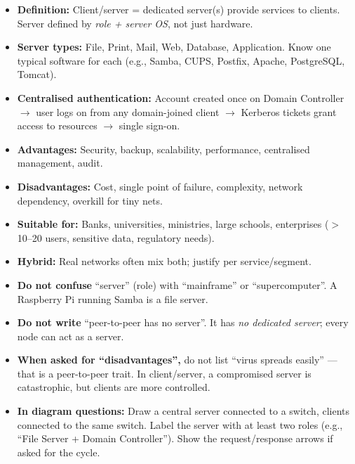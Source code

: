 \documentclass[11pt]{article}
\newcounter{popsec}
\newcounter{popsub}
\newcommand{\courssub}[1]{%
  \stepcounter{popsub}%
  \par\vspace{9pt}\noindent{\popxbold\fontsize{11.5}{13}\selectfont\color{popink}{\color{poporange}\thepopsec.\thepopsub}\hspace{6pt}#1}\par\nopagebreak\vspace{4pt}
}
\begin{document}
\courssub{Summary and Examination Focus}

\begin{aretenir}
\begin{itemize}
\item \textbf{Definition:} Client/server = dedicated server(s) provide services to clients. Server defined by \emph{role + server OS}, not just hardware.
\item \textbf{Server types:} File, Print, Mail, Web, Database, Application. Know one typical software for each (e.g., Samba, CUPS, Postfix, Apache, PostgreSQL, Tomcat).
\item \textbf{Centralised authentication:} Account created once on Domain Controller $\rightarrow$ user logs on from any domain-joined client $\rightarrow$ Kerberos tickets grant access to resources $\rightarrow$ single sign-on.
\item \textbf{Advantages:} Security, backup, scalability, performance, centralised management, audit.
\item \textbf{Disadvantages:} Cost, single point of failure, complexity, network dependency, overkill for tiny nets.
\item \textbf{Suitable for:} Banks, universities, ministries, large schools, enterprises ($>$ 10--20 users, sensitive data, regulatory needs).
\item \textbf{Hybrid:} Real networks often mix both; justify per service/segment.
\end{itemize}
\end{aretenir}

\begin{attention}
\begin{itemize}
\item \textbf{Do not confuse} ``server'' (role) with ``mainframe'' or ``supercomputer''. A Raspberry Pi running Samba is a file server.
\item \textbf{Do not write} ``peer-to-peer has no server''. It has \emph{no dedicated server}; every node can act as a server.
\item \textbf{When asked for ``disadvantages'',} do not list ``virus spreads easily'' — that is a peer-to-peer trait. In client/server, a compromised server is catastrophic, but clients are more controlled.
\item \textbf{In diagram questions:} Draw a central server connected to a switch, clients connected to the same switch. Label the server with at least two roles (e.g., ``File Server + Domain Controller''). Show the request/response arrows if asked for the cycle.
\end{itemize}
\end{attention}
\end{document}

